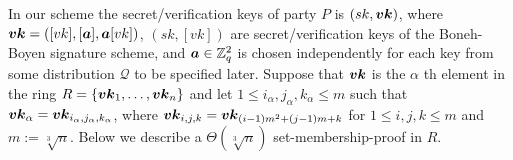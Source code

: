 %
%
%

In our scheme the secret/verification keys of party $P$ is $(sk,{\boldsymbol{vk}})$, where ${\boldsymbol{vk}}=([vk],[{\boldsymbol{a}}],{\boldsymbol{a}}[vk])$, $(sk,[vk])$ are secret/verification keys of the Boneh-Boyen signature scheme, and ${\boldsymbol{a}}\in\mathbb{Z}_q^2$ is chosen independently for each key from some distribution $\mathcal{Q}$ to be specified later. Suppose that ${\boldsymbol{vk}}$ is the $\alpha$ th element in the ring $R=\{{\boldsymbol{vk}}_{1},\ldots,{\boldsymbol{vk}}_{n}\}$ and let $1\leq i_\alpha,j_\alpha,k_\alpha \leq m$ such that ${\boldsymbol{vk}}_\alpha = {\boldsymbol{vk}}_{i_\alpha,j_\alpha,k_\alpha}$, where ${\boldsymbol{vk}}_{i,j,k}={\boldsymbol{vk}}_{(i-1)m^2+(j-1)m+k}$ for $1\leq  i,j,k\leq m$ and $m:=\sqrt[3]{n}$. Below we describe a $\Theta(\sqrt[3]{n})$ set-membership-proof in $R$.

